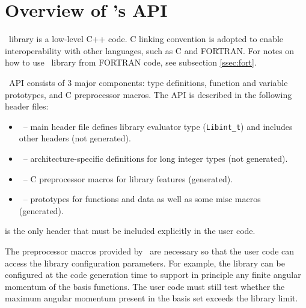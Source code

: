 \documentclass[12pt]{article}
\begin{document}
\section{Overview of \LIBINT 's API}

\LIBINT\ library is a low-level C++ code. C linking convention is adopted to enable interoperability with other languages, such as C and FORTRAN.
For notes on how to use \LIBINT\ library from FORTRAN code, see subsection \ref{ssec:fort}.

\LIBINT\ API consists of 3 major components: type definitions, function and variable prototypes, and C preprocessor macros.
The API is described in the following header files:
\begin{itemize}
\item \libinth\ -- main header file defines library evaluator type ({\tt Libint\_t}) and includes other headers (not generated).
\item \libinttypesh\ -- architecture-specific definitions for long integer types (not generated).
\item \libintparamsh\ -- C preprocessor macros for library features (generated).
\item \libintifaceh\ -- prototypes for functions and data as well as some misc macros (generated).
\end{itemize}
\libinth is the only header that must be included explicitly in the user code.

The preprocessor macros provided by \libinth\ are necessary so that the user code can
access the library configuration parameters. For example, the library can be configured at the code generation time
to support in principle any finite angular momentum of the basis functions. The user code must still
test whether the maximum angular momentum present in the basis set exceeds the library limit.
\end{document}
